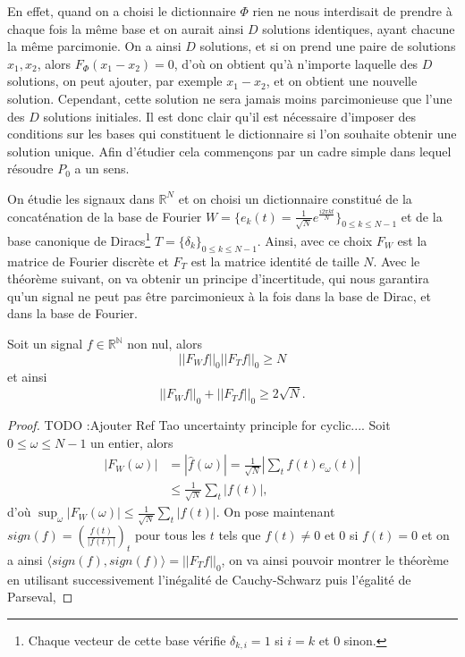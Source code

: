 En effet, quand on a choisi le dictionnaire $\Phi$ rien ne nous interdisait de prendre à chaque fois la même base et on aurait ainsi $D$ solutions identiques, ayant chacune la même parcimonie.
On a ainsi $D$ solutions, et si on prend une paire de solutions $x_1, x_2$, alors $F_\Phi(x_1 - x_2) = 0$, d'où on obtient qu'à n'importe laquelle des $D$ solutions, on peut ajouter, par exemple $x_1 - x_2$, et on obtient une nouvelle solution. 
Cependant, cette solution ne sera jamais moins parcimonieuse que l'une des $D$ solutions initiales.
Il est donc clair qu'il est nécessaire d'imposer des conditions sur les bases qui constituent le dictionnaire si l'on souhaite obtenir une solution unique.
Afin d'étudier cela commençons par un cadre simple dans lequel résoudre $P_0$ a un sens.
\begin{exemple}
	On étudie les signaux dans $\mathbb{R}^N$ et on choisi un dictionnaire constitué de la concaténation de la base de Fourier $ W = \{e_k(t) = \frac{1}{\sqrt{N}} e^{\frac{i 2\pi k t}{N}}\}_{0 \leq k \leq N -1}$ et de la base canonique de Diracs\footnote{Chaque vecteur de cette base vérifie $\delta_{k,i} = 1$ si $i = k$ et 0 sinon.} $T = \{\delta_k\}_{0 \leq k \leq N-1}$.
	Ainsi, avec ce choix $F_W$ est la matrice de Fourier discrète et $F_T$ est la matrice identité de taille $N$.
	Avec le théorème suivant, on va obtenir un principe d'incertitude, qui nous garantira qu'un signal ne peut pas être parcimonieux à la fois dans la base de Dirac, et dans la base de Fourier.
	\begin{theoreme}\label{th:Incert1}
		Soit un signal $f\in \mathbb{R^N}$ non nul, alors
		\begin{equation}
			||F_W f||_0 ||F_T f||_0 \geq N 	
		\end{equation}
		et ainsi
		\begin{equation}
			||F_W f||_0 + ||F_T f||_0 \geq 2 \sqrt{N}. 	
		\end{equation}
	\end{theoreme}
	\begin{proof}
	TODO :Ajouter Ref Tao uncertainty principle for cyclic....
		Soit $0 \leq \omega \leq N-1$ un entier, alors 
		\begin{align}
			|F_W(\omega)| &= |\hat{f}(\omega)| = \frac{1}{\sqrt{N}}|\sum_t f(t)e_\omega(t)| \\
				&\leq \frac{1}{\sqrt{N}}\sum_t |f(t)|,
		\end{align}
		d'où $\sup_\omega |F_W(\omega)| \leq \frac{1}{\sqrt{N}} \sum_t |f(t)|$.
		On pose maintenant $sign(f) = (\frac{f(t)}{|f(t)|})_t$ pour tous les $t$ tels que $f(t) \neq 0$ et 0 si $f(t) = 0$ et on a ainsi $\langle sign(f), sign(f) \rangle = ||F_T f||_0$, on va ainsi pouvoir montrer le théorème en utilisant successivement l'inégalité de Cauchy-Schwarz puis l'égalité de Parseval,

\end{proof}
\end{exemple}

